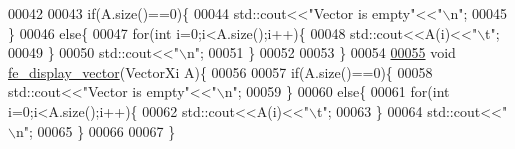 \begin{DoxyCode}
00042 
00043     \textcolor{keywordflow}{if}(A.size()==0)\{
00044         std::cout<<\textcolor{stringliteral}{"Vector is empty"}<<\textcolor{stringliteral}{"\(\backslash\)n"};
00045     \}
00046     \textcolor{keywordflow}{else}\{
00047         \textcolor{keywordflow}{for}(\textcolor{keywordtype}{int} i=0;i<A.size();i++)\{
00048             std::cout<<A(i)<<\textcolor{stringliteral}{"\(\backslash\)t"};
00049         \}
00050         std::cout<<\textcolor{stringliteral}{"\(\backslash\)n"};
00051     \}
00052 
00053 \}
00054 
\hyperlink{fe__display_8cpp_ae8f2fe8ea3b7564cbf37116edf47b103}{00055} \textcolor{keywordtype}{void} \hyperlink{fe__display_8cpp_ab3e39c6d01b6fd10c9e264731cef75dc}{fe\_display\_vector}(VectorXi A)\{
00056 
00057     \textcolor{keywordflow}{if}(A.size()==0)\{
00058         std::cout<<\textcolor{stringliteral}{"Vector is empty"}<<\textcolor{stringliteral}{"\(\backslash\)n"};
00059     \}
00060     \textcolor{keywordflow}{else}\{
00061         \textcolor{keywordflow}{for}(\textcolor{keywordtype}{int} i=0;i<A.size();i++)\{
00062             std::cout<<A(i)<<\textcolor{stringliteral}{"\(\backslash\)t"};
00063         \}
00064         std::cout<<\textcolor{stringliteral}{"\(\backslash\)n"};
00065     \}
00066 
00067 \}
\end{DoxyCode}
